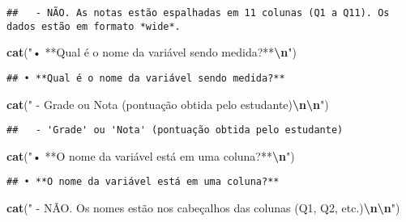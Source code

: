 \documentclass[
]{article}
\newenvironment{Shaded}{\begin{snugshade}}{\end{snugshade}}
\newcommand{\FunctionTok}[1]{\textcolor[rgb]{0.13,0.29,0.53}{\textbf{#1}}}
\newcommand{\NormalTok}[1]{#1}
\newcommand{\SpecialCharTok}[1]{\textcolor[rgb]{0.81,0.36,0.00}{\textbf{#1}}}
\newcommand{\StringTok}[1]{\textcolor[rgb]{0.31,0.60,0.02}{#1}}
\begin{document}
\begin{verbatim}
##   - NÃO. As notas estão espalhadas em 11 colunas (Q1 a Q11). Os dados estão em formato *wide*.
\end{verbatim}

\begin{Shaded}
\begin{Highlighting}[]
\FunctionTok{cat}\NormalTok{(}\StringTok{"• **Qual é o nome da variável sendo medida?**}\SpecialCharTok{\textbackslash{}n}\StringTok{"}\NormalTok{)}
\end{Highlighting}
\end{Shaded}

\begin{verbatim}
## • **Qual é o nome da variável sendo medida?**
\end{verbatim}

\begin{Shaded}
\begin{Highlighting}[]
\FunctionTok{cat}\NormalTok{(}\StringTok{"  {-} \textquotesingle{}Grade\textquotesingle{} ou \textquotesingle{}Nota\textquotesingle{} (pontuação obtida pelo estudante)}\SpecialCharTok{\textbackslash{}n\textbackslash{}n}\StringTok{"}\NormalTok{)}
\end{Highlighting}
\end{Shaded}

\begin{verbatim}
##   - 'Grade' ou 'Nota' (pontuação obtida pelo estudante)
\end{verbatim}

\begin{Shaded}
\begin{Highlighting}[]
\FunctionTok{cat}\NormalTok{(}\StringTok{"• **O nome da variável está em uma coluna?**}\SpecialCharTok{\textbackslash{}n}\StringTok{"}\NormalTok{)}
\end{Highlighting}
\end{Shaded}

\begin{verbatim}
## • **O nome da variável está em uma coluna?**
\end{verbatim}

\begin{Shaded}
\begin{Highlighting}[]
\FunctionTok{cat}\NormalTok{(}\StringTok{"  {-} NÃO. Os nomes estão nos cabeçalhos das colunas (Q1, Q2, etc.)}\SpecialCharTok{\textbackslash{}n\textbackslash{}n}\StringTok{"}\NormalTok{)}
\end{Highlighting}
\end{Shaded}
\end{document}
